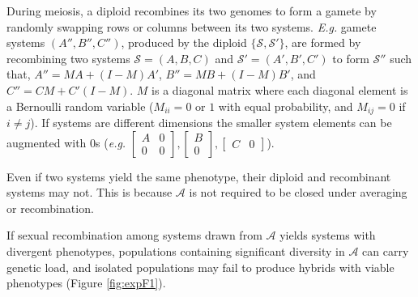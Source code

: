 \documentclass{article}
\newcommand{\1}{\mathbbm{1}}
\newcommand{\Sys}{\mathcal{S}}
\newcommand{\allS}{\mathcal{A}}
\begin{document}
     During meiosis, a diploid recombines its two genomes to form a gamete by randomly swapping rows or columns between its two systems.
  \emph{E.g.} gamete systems $(A'', B'', C'')$, produced by the diploid $\{\Sys, \Sys'\}$, are formed by recombining two systems $\Sys = (A,B,C)$ and $\Sys' = (A', B', C')$  to form $\Sys''$ such that,
   $A'' = MA + (I-M)A'$, 
   $B'' = MB + (I-M)B'$, and
   $C'' = CM + C'(I-M)$.
  $M$ is a diagonal matrix where each diagonal element is a Bernoulli random variable ($M_{ii} = 0$ or $1$ with equal probability, and $M_{ij}=0$ if $i \neq j$). If systems are different dimensions the smaller system elements can be augmented with $0$s (\emph{e.g.} $\left[ \begin{smallmatrix} A & 0 \\ 0 & 0 \end{smallmatrix} \right], \left[ \begin{smallmatrix} B \\ 0 \end{smallmatrix} \right], \left[ \begin{smallmatrix} C & 0 \end{smallmatrix}\right]$).

Even if two systems yield the same phenotype, their diploid and recombinant systems may not. This is because $\allS$ is not required to be closed under averaging or recombination.

If sexual recombination among systems drawn from $\allS$ yields systems with divergent phenotypes, populations containing significant diversity in $\allS$ can carry genetic load, and isolated populations may fail to produce hybrids with viable phenotypes (Figure \ref{fig:expF1}).
\end{document}
